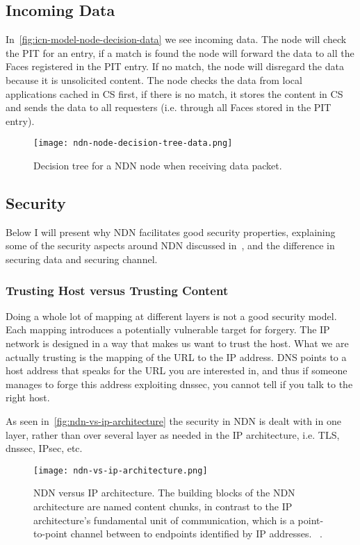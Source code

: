 \subsection{Incoming Data}\label{incoming-data}
In~\autoref{fig:icn-model-node-decision-data} we see incoming \gls{data}.
The node will check  the \gls{PIT} for an entry, if a match is found the node will forward the \gls{data} to all the Faces registered in the \gls{PIT} entry.
If no match, the node will disregard the \gls{data} because it is unsolicited content.
The node checks the \gls{data} from local applications cached in \gls{CS} first, if there is no match, it stores the content in \gls{CS} and sends the \gls{data} to all requesters (i.e. through all Faces stored in the \gls{PIT} entry).
\begin{figure}[H]
  \centering
  \texttt{[image: ndn-node-decision-tree-data.png]}
  \caption[Incoming Data - NDN node]{Decision tree for a NDN node when receiving \gls{data} packet.}
  \label{fig:icn-model-node-decision-data}
\end{figure}


\subsection{Security}\label{ndn-security}
Below I will present why \gls{NDN} facilitates good security properties, explaining some of the security aspects around \gls{NDN} discussed in~\cite{secure-network-content}, and the difference in securing data and securing channel.

\subsubsection{Trusting Host versus Trusting Content}
Doing a whole lot of mapping at different layers is not a good security model.
Each mapping introduces a potentially vulnerable target for forgery.
The \gls{IP} network is designed in a way that makes us want to trust the host.
What we are actually trusting is the mapping of the \gls{URL} to the \gls{IP} address.
\gls{DNS} points to a host address that speaks for the \gls{URL} you are interested in, and thus if someone manages to forge this address exploiting \gls{dnssec}, you cannot tell if you talk to the right host.

As seen in~\autoref{fig:ndn-vs-ip-architecture} the security in \gls{NDN} is dealt with in one layer, rather than over several layer as needed in the \gls{IP} architecture, i.e. \gls{TLS}, \gls{dnssec}, \gls{IPsec}, etc.
\begin{figure}[ht]
  \centering
  \texttt{[image: ndn-vs-ip-architecture.png]}
  \caption[NDN versus IP architecture]{NDN versus IP architecture. 
  The building blocks of the NDN architecture are named content chunks, in contrast to the IP architecture's fundamental unit of communication, which is a point-to-point channel between to endpoints identified by IP addresses.
  ~\cite{DBLP:journals/ccr/0001ABJcCPWZ14}.
  }
  \label{fig:ndn-vs-ip-architecture}
\end{figure}

